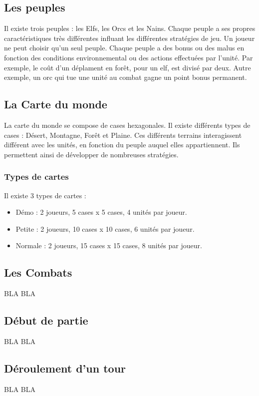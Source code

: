 \documentclass[12pt]{article}
\begin{document}
\subsection{Les peuples}
Il existe trois peuples : les Elfs, les Orcs et les Nains. Chaque peuple a ses propres caractéristiques très différentes influant les différentes stratégies de jeu. Un joueur ne peut choisir qu'un seul peuple.
Chaque peuple a des bonus ou des malus en fonction des conditions environnemental ou des actions effectuées par l'unité. Par exemple, le coût d'un déplament en forêt, pour un elf, est divisé par deux. Autre exemple, un orc qui tue une unité au combat gagne un point bonus permanent.

\subsection{La Carte du monde}
La carte du monde se compose de cases hexagonales. Il existe différents types de cases : Désert, Montagne, Forêt et Plaine. Ces différents terrains interagissent différent avec les unités, en fonction du peuple auquel elles appartiennent. Ils permettent ainsi de développer de nombreuses stratégies.

\subsubsection{Types de cartes}
Il existe 3 types de cartes :
\begin{itemize}
  \item Démo : 2 joueurs, 5 cases x 5 cases, 4 unités par joueur.
  \item Petite : 2 joueurs, 10 cases x 10 cases, 6 unités par joueur.
  \item Normale :  2 joueurs, 15 cases x 15 cases, 8 unités par joueur.
\end{itemize}

\subsection{Les Combats}
BLA BLA

\subsection{Début de partie}
BLA BLA

\subsection{Déroulement d'un tour}
BLA BLA
\newpage
\end{document}
